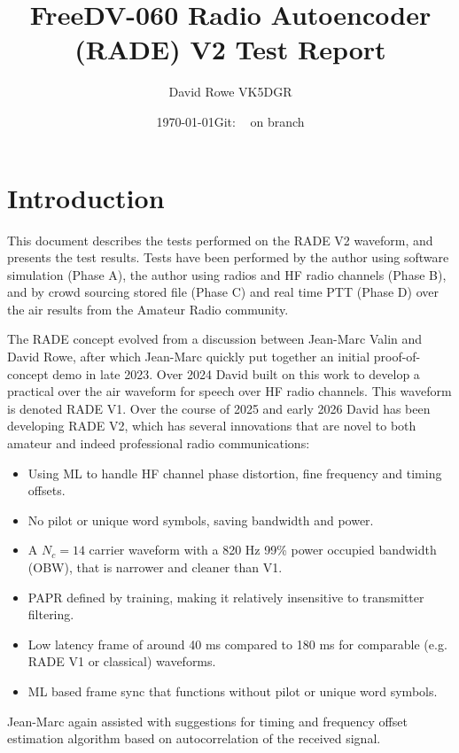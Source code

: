 \documentclass{article}
\newcommand{\commit}{\dots~(in \emph{packed-refs})}}
\newcommand{\gitrevision}{%
  \StrLeft{\commit}{7}%
}
\begin{document}


\title{FreeDV-060 Radio Autoencoder (RADE) V2 Test Report}
\author{David Rowe VK5DGR}
\date{\today \quad Git: \texttt{\gitrevision} on branch \texttt{\branch}\\}
\maketitle

\section{Introduction}

This document describes the tests performed on the RADE V2 waveform, and presents the test results.  Tests have been performed by the author using software simulation (Phase A), the author using radios and HF radio channels (Phase B), and by crowd sourcing stored file (Phase C) and real time PTT (Phase D) over the air results from the Amateur Radio community.

The RADE concept evolved from a discussion between Jean-Marc Valin and David Rowe, after which Jean-Marc quickly put together an initial proof-of-concept demo in late 2023. Over 2024 David built on this work to develop a practical over the air waveform for speech over HF radio channels. This waveform is denoted RADE V1. 
Over the course of 2025 and early 2026 David has been developing RADE V2, which has several innovations that are novel to both amateur and indeed professional radio communications:
\begin{itemize}
\item Using ML to handle HF channel phase distortion, fine frequency and timing offsets.
\item No pilot or unique word symbols, saving bandwidth and power.
\item A $N_c=14$ carrier waveform with a 820 \si{Hz} 99\% power occupied bandwidth (OBW), that is narrower and cleaner than V1.
\item PAPR defined by training, making it relatively insensitive to transmitter filtering.
\item Low latency frame of around 40 \si{ms} compared to 180 \si{ms} for comparable (e.g. RADE V1 or classical) waveforms.
\item ML based frame sync that functions without pilot or unique word symbols.
\end{itemize}
Jean-Marc again assisted with suggestions for timing and frequency offset estimation algorithm based on autocorrelation of the received signal.
\end{document}
